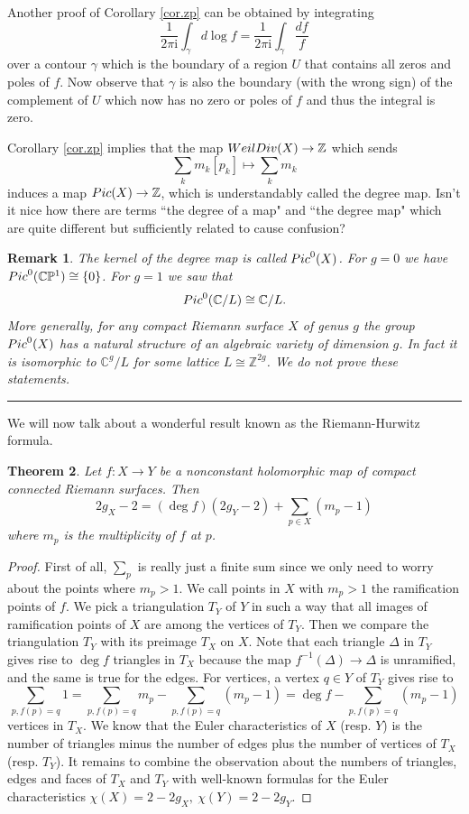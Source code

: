 \documentclass[11pt]{article}
\numberwithin{equation}{section}
\numberwithin{footnote}{section}
\newtheorem{thm}{Theorem}[section]
\newtheorem{rem}[thm]{Remark}
\newcommand{\blue}{\color{blue}}
\newcommand{\ii}{{\mathrm i}}
\renewcommand{\P}{{\mathbb P}}
\newcommand{\Z}{{\mathbb Z}}
\newcommand{\C}{{\mathbb C}}
\begin{document}
Another proof of Corollary \ref{cor.zp} can be obtained by integrating 
$$
\frac 1{2\pi\ii} \int_\gamma d \log f = \frac 1{2\pi\ii} \int_\gamma  \frac {df}f 
$$
over a contour $\gamma$ which is the boundary of a region $U$ that contains all zeros and poles of $f$. Now observe that $\gamma$ is also the boundary (with the wrong sign) of the complement of $U$ which now has no zero or poles of $f$ and thus the integral is zero.


\smallskip
Corollary \ref{cor.zp} implies that the map ${\rm WeilDiv}(X)\to \Z$ which sends 
$$
\sum_k m_k [p_k] \mapsto \sum_k m_k
$$
induces a map ${\rm Pic}(X)\to \Z$, which is understandably called the {\blue degree map.} Isn't it nice how there are terms ``the degree of a map" and ``the degree map" which are quite different but sufficiently related to cause confusion?


\smallskip
\begin{rem}
The kernel of the degree map is called ${\rm Pic}^0(X)$. For $g=0$ we have ${\rm Pic}^0(\C\P^1) \cong \{0\}$. For $g=1$ we saw that 
$$
 {\rm Pic}^0(\C/L) \cong \C/L.
$$
More generally, for any compact Riemann surface $X$ of genus $g$ the group ${\rm Pic}^0(X)$ has a natural structure of an algebraic variety of dimension $g$. In fact it is isomorphic to $\C^g/L$ for some lattice $L\cong \Z^{2g}$. We do not prove these statements.
\end{rem}

\smallskip
{\blue \hrule} 
We will now talk about a wonderful result known as the {\blue Riemann-Hurwitz formula}. 
\begin{thm}\label{RH}
Let $f:X\to Y$ be a nonconstant holomorphic map of compact connected Riemann surfaces. Then
$$
2g_X-2 = (\deg f)(2g_Y-2) + \sum_{p\in X}(m_p-1)
$$
where $m_p$ is the multiplicity of $f$ at $p$.
\end{thm}

\begin{proof}
First of all, $\sum_p$ is really just a finite sum since we only need to worry about the points where $m_p>1$. We call
points in $X$ with $m_p>1$ the {\blue ramification points} of $f$.
We pick a triangulation $T_Y$ of $Y$ in such a way that all images of ramification points of $X$ are among the vertices of $T_Y$.
Then we compare the triangulation $T_Y$ with its preimage $T_X$ on $X$. Note that each triangle $\Delta$ in $T_Y$ gives rise to $\deg f$ triangles in $T_X$ because the map $f^{-1}(\Delta)\to\Delta$ is unramified, and the same is true for the edges. For vertices, a vertex $q\in Y$ of $T_Y$ gives rise to 
$$
\sum_{p,f(p)=q}1=\sum_{p,f(p)=q}m_p - \sum_{p,f(p)=q} (m_p-1)
=
\deg f - \sum_{p,f(p)=q} (m_p-1)
$$
vertices in $T_X$. We know that the Euler characteristics of $X$ (resp. $Y$) is the number of triangles minus the number of edges plus the number of vertices of $T_X$ (resp. $T_Y$). It remains to combine the observation about the numbers of triangles, edges and faces of $T_X$ and $T_Y$ with well-known formulas for the Euler characteristics
$
\chi(X) = 2-2g_X,~\chi(Y)= 2- 2g_Y.
$
\end{proof}
\end{document}
